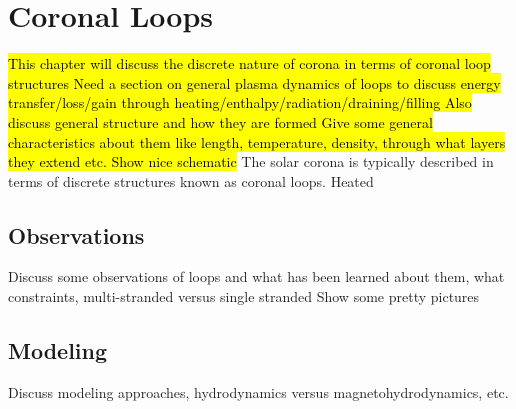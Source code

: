 \chapter{Coronal Loops}
\label{ch:coronal_loops}
\hl{This chapter will discuss the discrete nature of corona in terms of coronal loop structures
Need a section on general plasma dynamics of loops to discuss energy transfer/loss/gain through heating/enthalpy/radiation/draining/filling
Also discuss general structure and how they are formed
Give some general characteristics about them like length, temperature, density, through what layers they extend etc.
Show nice schematic}
The solar corona is typically described in terms of discrete structures known as coronal loops. Heated   
\section{Observations}
\label{sec:observations}
Discuss some observations of loops and what has been learned about them, what constraints, multi-stranded versus single stranded
Show some pretty pictures
\section{Modeling}
\label{sec:modeling}
Discuss modeling approaches, hydrodynamics versus magnetohydrodynamics, etc.

